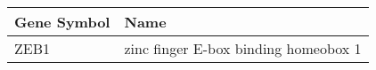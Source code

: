 \begin{tabular}{ll}
\toprule
Gene Symbol &                                 Name \\
\midrule
       ZEB1 & zinc finger E-box binding homeobox 1 \\
\bottomrule
\end{tabular}
